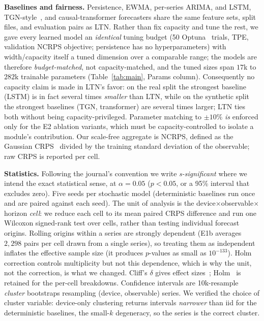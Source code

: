\documentclass[journal]{IEEEtran}
\begin{document}
\textbf{Baselines and fairness.} Persistence, EWMA, per-series ARIMA, and
LSTM, TGN-style~\cite{tgn2020}, and causal-transformer forecasters share the same
feature sets, split files, and evaluation pairs as LTN\@. Rather than fix capacity and
tune the rest, we gave every learned model an \emph{identical} tuning budget (50
Optuna~\cite{akiba2019optuna} trials, TPE, validation NCRPS objective; persistence
has no hyperparameters) with width/capacity itself a tuned dimension over a
comparable range; the models are therefore \emph{budget-matched}, not
capacity-matched, and the tuned sizes span $17$k to $282$k trainable parameters
(Table~\ref{tab:main}, Params column). Consequently no capacity claim is made in
LTN's favor: on the real split the strongest baseline (LSTM) is in fact several times
\emph{smaller} than LTN, while on the synthetic split the strongest baselines
(TGN, transformer) are several times larger; LTN ties both without being
capacity-privileged. Parameter matching to $\pm10\%$ \emph{is} enforced only for the
E2 ablation variants, which must be capacity-controlled to isolate a module's
contribution. Our scale-free aggregate is NCRPS, defined as the Gaussian
CRPS~\cite{gneiting2007crps} divided by the training standard deviation of the
observable; raw CRPS is reported per cell.

\textbf{Statistics.} Following the journal's convention we write \emph{s-significant}
where we intend the exact statistical sense, at $\alpha=0.05$ ($p<0.05$, or a 95\%
interval that excludes zero). Five seeds per stochastic model (deterministic baselines run
once and are paired against each seed). The unit of analysis is the
device$\times$observable$\times$horizon \emph{cell}: we reduce each cell to its mean
paired CRPS difference and run one Wilcoxon signed-rank test over cells, rather than
testing individual forecast origins. Rolling origins within a series are strongly
dependent (E1b averages $2{,}298$ pairs per cell drawn from a single series), so
treating them as independent inflates the effective sample size (it produces
$p$-values as small as $10^{-133}$). Holm correction controls multiplicity but not
this dependence, which is why the unit, not the correction, is what we changed.
Cliff's $\delta$ gives effect sizes~\cite{cliff1993}; Holm~\cite{holm1979} is retained
for the per-cell breakdowns. Confidence intervals are 10k-resample \emph{cluster}
bootstraps resampling (device, observable) series. We verified the choice of cluster
variable: device-only clustering returns intervals \emph{narrower} than iid for the
deterministic baselines, the small-$k$ degeneracy, so the series is the correct
cluster.
\end{document}
